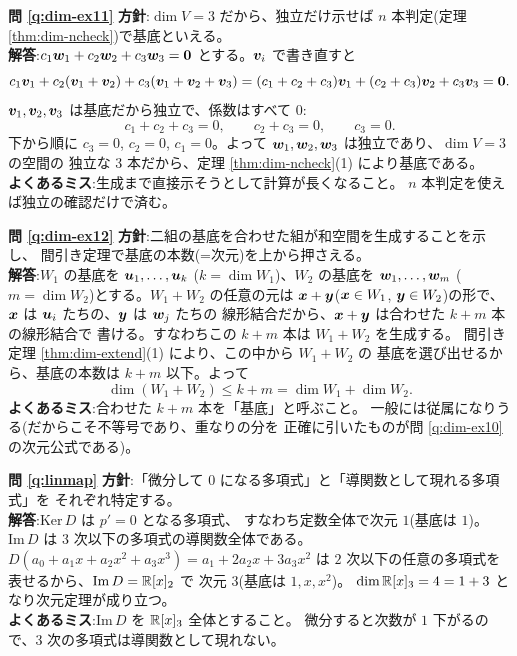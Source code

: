 \bigskip
\noindent\textbf{問 \ref{q:dim-ex11}}\quad
\textbf{方針}:$\dim V = 3$ だから、独立だけ示せば
$n$ 本判定(定理 \ref{thm:dim-ncheck})で基底といえる。\\
\textbf{解答}:$c_1\bm{w}_1 + c_2\bm{w}_2 + c_3\bm{w}_3 = \bm{0}$
とする。$\bm{v}_i$ で書き直すと
\[
c_1\bm{v}_1 + c_2(\bm{v}_1 + \bm{v}_2)
+ c_3(\bm{v}_1 + \bm{v}_2 + \bm{v}_3)
= (c_1 + c_2 + c_3)\bm{v}_1 + (c_2 + c_3)\bm{v}_2 + c_3\bm{v}_3
= \bm{0}.
\]
$\bm{v}_1, \bm{v}_2, \bm{v}_3$ は基底だから独立で、係数はすべて $0$:
\[
c_1 + c_2 + c_3 = 0, \qquad c_2 + c_3 = 0, \qquad c_3 = 0.
\]
下から順に $c_3 = 0$, $c_2 = 0$, $c_1 = 0$。よって
$\bm{w}_1, \bm{w}_2, \bm{w}_3$ は独立であり、$\dim V = 3$ の空間の
独立な $3$ 本だから、定理 \ref{thm:dim-ncheck}(1) により基底である。\\
\textbf{よくあるミス}:生成まで直接示そうとして計算が長くなること。
$n$ 本判定を使えば独立の確認だけで済む。

\bigskip
\noindent\textbf{問 \ref{q:dim-ex12}}\quad
\textbf{方針}:二組の基底を合わせた組が和空間を生成することを示し、
間引き定理で基底の本数(=次元)を上から押さえる。\\
\textbf{解答}:$W_1$ の基底を $\bm{u}_1, \dots, \bm{u}_k$
($k = \dim W_1$)、$W_2$ の基底を $\bm{w}_1, \dots, \bm{w}_m$
($m = \dim W_2$)とする。$W_1 + W_2$ の任意の元は
$\bm{x} + \bm{y}$($\bm{x} \in W_1$, $\bm{y} \in W_2$)の形で、
$\bm{x}$ は $\bm{u}_i$ たちの、$\bm{y}$ は $\bm{w}_j$ たちの
線形結合だから、$\bm{x} + \bm{y}$ は合わせた $k + m$ 本の線形結合で
書ける。すなわちこの $k + m$ 本は $W_1 + W_2$ を生成する。
間引き定理 \ref{thm:dim-extend}(1) により、この中から $W_1 + W_2$ の
基底を選び出せるから、基底の本数は $k + m$ 以下。よって
\[
\dim(W_1 + W_2) \le k + m = \dim W_1 + \dim W_2.
\]
\textbf{よくあるミス}:合わせた $k + m$ 本を「基底」と呼ぶこと。
一般には従属になりうる(だからこそ不等号であり、重なりの分を
正確に引いたものが問 \ref{q:dim-ex10} の次元公式である)。

\bigskip
\noindent\textbf{問 \ref{q:linmap}}\quad
\textbf{方針}:「微分して $0$ になる多項式」と「導関数として現れる多項式」を
それぞれ特定する。\\
\textbf{解答}:$\mathrm{Ker}\,D$ は $p' = 0$ となる多項式、
すなわち定数全体で次元 $1$(基底は $1$)。
$\mathrm{Im}\,D$ は $3$ 次以下の多項式の導関数全体である。
$D(a_0 + a_1 x + a_2 x^2 + a_3 x^3) = a_1 + 2a_2 x + 3a_3 x^2$ は
$2$ 次以下の任意の多項式を表せるから、$\mathrm{Im}\,D = \mathbb{R}[x]_2$ で
次元 $3$(基底は $1, x, x^2$)。
$\dim \mathbb{R}[x]_3 = 4 = 1 + 3$ となり次元定理が成り立つ。\\
\textbf{よくあるミス}:$\mathrm{Im}\,D$ を $\mathbb{R}[x]_3$ 全体とすること。
微分すると次数が $1$ 下がるので、$3$ 次の多項式は導関数として現れない。


